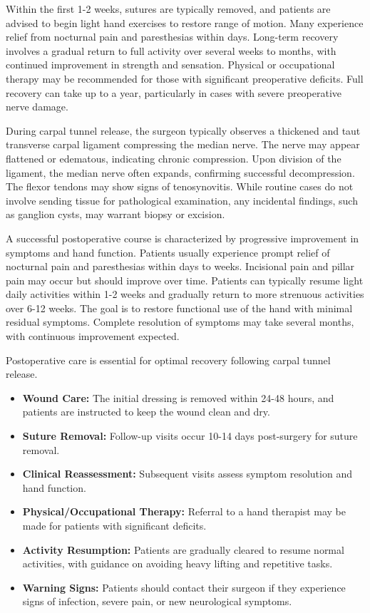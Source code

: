 Within the first 1-2 weeks, sutures are typically removed, and patients are advised to begin light hand exercises to restore range of motion. Many experience relief from nocturnal pain and paresthesias within days. Long-term recovery involves a gradual return to full activity over several weeks to months, with continued improvement in strength and sensation. Physical or occupational therapy may be recommended for those with significant preoperative deficits. Full recovery can take up to a year, particularly in cases with severe preoperative nerve damage.

During carpal tunnel release, the surgeon typically observes a thickened and taut transverse carpal ligament compressing the median nerve. The nerve may appear flattened or edematous, indicating chronic compression. Upon division of the ligament, the median nerve often expands, confirming successful decompression. The flexor tendons may show signs of tenosynovitis. While routine cases do not involve sending tissue for pathological examination, any incidental findings, such as ganglion cysts, may warrant biopsy or excision.

A successful postoperative course is characterized by progressive improvement in symptoms and hand function. Patients usually experience prompt relief of nocturnal pain and paresthesias within days to weeks. Incisional pain and pillar pain may occur but should improve over time. Patients can typically resume light daily activities within 1-2 weeks and gradually return to more strenuous activities over 6-12 weeks. The goal is to restore functional use of the hand with minimal residual symptoms. Complete resolution of symptoms may take several months, with continuous improvement expected.

Postoperative care is essential for optimal recovery following carpal tunnel release.

\begin{itemize}
  \item \textbf{Wound Care:} The initial dressing is removed within 24-48 hours, and patients are instructed to keep the wound clean and dry.
  \item \textbf{Suture Removal:} Follow-up visits occur 10-14 days post-surgery for suture removal.
  \item \textbf{Clinical Reassessment:} Subsequent visits assess symptom resolution and hand function.
  \item \textbf{Physical/Occupational Therapy:} Referral to a hand therapist may be made for patients with significant deficits.
  \item \textbf{Activity Resumption:} Patients are gradually cleared to resume normal activities, with guidance on avoiding heavy lifting and repetitive tasks.
  \item \textbf{Warning Signs:} Patients should contact their surgeon if they experience signs of infection, severe pain, or new neurological symptoms.
\end{itemize}

